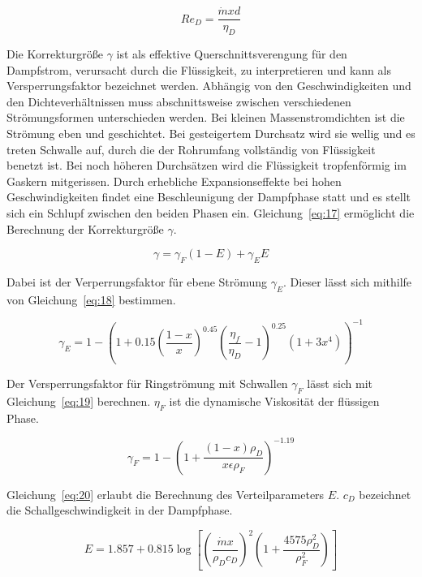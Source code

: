 \begin{equation}
\label{eq:16}
Re_D = \frac{\dot{m} x d}{\eta_D}
\end{equation}

Die Korrekturgröße $\gamma$ ist als effektive Querschnittsverengung für den Dampfstrom, verursacht durch die Flüssigkeit, zu interpretieren und kann als Versperrungsfaktor bezeichnet werden. Abhängig von den Geschwindigkeiten und den Dichteverhältnissen muss abschnittsweise zwischen verschiedenen Strömungsformen unterschieden werden. Bei kleinen Massenstromdichten ist die Strömung eben und geschichtet. Bei gesteigertem Durchsatz wird sie wellig und es treten Schwalle auf, durch die der Rohrumfang vollständig von Flüssigkeit benetzt ist. Bei noch höheren Durchsätzen wird die Flüssigkeit tropfenförmig im Gaskern mitgerissen. Durch erhebliche Expansionseffekte bei hohen Geschwindigkeiten findet eine Beschleunigung der Dampfphase statt und es stellt sich ein Schlupf zwischen den beiden Phasen ein\cite{Kesper.1976}.
Gleichung~\ref{eq:17} ermöglicht die Berechnung der Korrekturgröße $\gamma$.

\begin{equation}
\label{eq:17}
\gamma = \gamma_F(1-E) + \gamma_E E
\end{equation}

Dabei ist der Verperrungsfaktor für ebene Strömung $\gamma_E$. Dieser lässt sich mithilfe von Gleichung~\ref{eq:18} bestimmen.

\begin{equation}
\label{eq:18}
\gamma_E = 1 - \left( 1+0.15 \left( \frac{1-x}{x} \right)^{0.45} \left( \frac{\eta_f}{\eta_D}-1 \right)^{0.25} (1 + 3x^4)\right)^{-1}
\end{equation}


Der Versperrungsfaktor für Ringströmung mit Schwallen $\gamma_F$ lässt sich mit Gleichung~\ref{eq:19} berechnen. $\eta_F$ ist die dynamische Viskosität der flüssigen Phase.

\begin{equation}
\label{eq:19}
\gamma_F = 1 - \left(1+\frac{(1-x)\rho_D}{x \epsilon \rho_F}\right)^{-1.19}
\end{equation}


Gleichung~\ref{eq:20} erlaubt die Berechnung des Verteilparameters $E$. $c_D$ bezeichnet die Schallgeschwindigkeit in der Dampfphase.

\begin{equation}
\label{eq:20}
E = 1.857 + 0.815 \log\left[\left(\frac{\dot{m} x}{\rho_D c_D}\right)^2 \left( 1+ \frac{4575 \rho_D^2}{\rho_F^2} \right)\right]
\end{equation}

